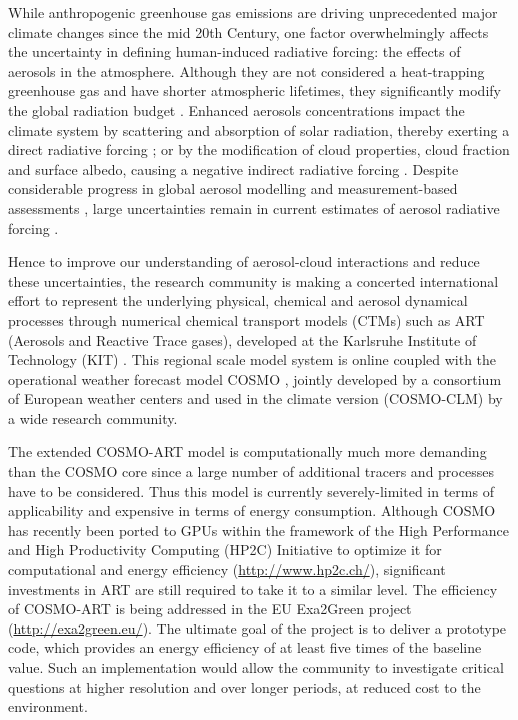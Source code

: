 While anthropogenic greenhouse gas emissions are driving unprecedented
major  climate  changes  since   the  mid  20th  Century,  one  factor
overwhelmingly  affects  the  uncertainty  in  defining  human-induced
radiative  forcing:  the  effects   of  aerosols  in  the  atmosphere.
Although they  are not considered  a heat-trapping greenhouse  gas and
have  shorter  atmospheric lifetimes,  they  significantly modify  the
global   radiation   budget   \citep{IPCC-2013}.   Enhanced   aerosols
concentrations impact the climate  system by scattering and absorption
of   solar   radiation,    thereby   exerting   a   direct   radiative
forcing  \citep{Liao-2005,  Bangert-2012,  Lundgren-2013}; or  by  the
modification of  cloud properties, cloud fraction  and surface albedo,
causing  a negative  indirect  radiative forcing  \citep{Haywood-2000,
Lohmann-2005,     VandenHeever-2011,     Rosenfeld-2013}.      Despite
considerable  progress in  global aerosol  modelling \citep{Mann-2013}
and    measurement-based    assessments   \citep{Myhre-2009},    large
uncertainties  remain  in   current  estimates  of  aerosol  radiative
forcing   \citep{Myhre-2013,    IPCC-2013,   Lee-2013,   Randles-2013,
Rosenfeld-2013, Sherwood-2013, Stier-2013}.

Hence to  improve our understanding of  aerosol-cloud interactions and
reduce  these  uncertainties,  the  research  community  is  making  a
concerted international  effort to represent  the underlying physical,
chemical  and aerosol dynamical  processes through  numerical chemical
transport  models (CTMs)  such  as ART  (Aerosols  and Reactive  Trace
gases),   developed   at  the   Karlsruhe   Institute  of   Technology
(KIT)  \citep{Vogel-2009,  Bangert-2011,  Knote-2013}.  This  regional
scale  model system  is online  coupled with  the  operational weather
forecast  model  COSMO \citep{Baldauf-2011},  jointly  developed by  a
consortium of European weather centers and used in the climate version
(COSMO-CLM) by a wide research community.

The extended  COSMO-ART model  is computationally much  more demanding
than the  COSMO core  since a large  number of additional  tracers and
processes  have  to  be  considered.   Thus this  model  is  currently
severely-limited in  terms of applicability and expensive  in terms of
energy consumption.   Although COSMO has recently been  ported to GPUs
within  the framework of  the High  Performance and  High Productivity
Computing  (HP2C)  Initiative to  optimize  it  for computational  and
energy efficiency (\url{http://www.hp2c.ch/}), significant investments
in  ART  are still  required  to  take it  to  a  similar level.   The
efficiency of COSMO-ART is being addressed in the EU Exa2Green project
(\url{http://exa2green.eu/}). The  ultimate goal of the  project is to
deliver a  prototype code, which  provides an energy efficiency  of at
least five times of the  baseline value.  Such an implementation would
allow  the  community  to  investigate critical  questions  at  higher
resolution  and   over  longer  periods,   at  reduced  cost   to  the
environment.

